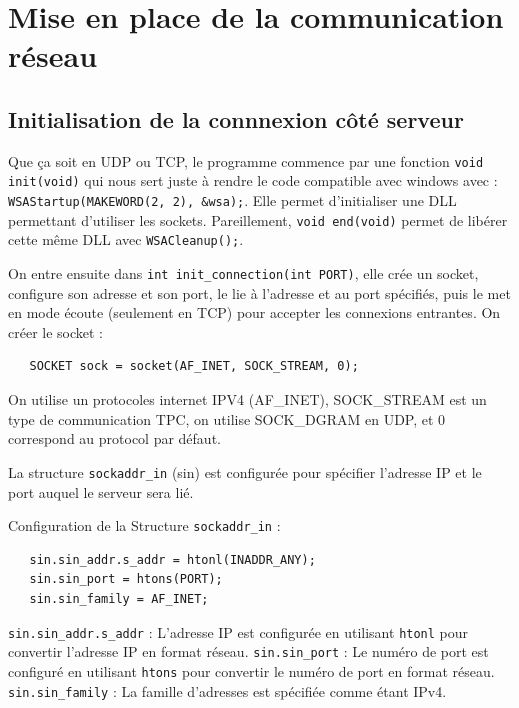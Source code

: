 \documentclass{article}
\begin{document}
\section{Mise en place de la communication réseau}

\subsection{Initialisation de la connnexion côté serveur}
Que ça soit en UDP ou TCP, le programme commence par une fonction \texttt{void init(void)} qui nous sert juste à rendre le code compatible avec windows avec : \texttt{WSAStartup(MAKEWORD(2, 2), &wsa);}. Elle permet d'initialiser une DLL permettant d'utiliser les sockets. Pareillement, \texttt{void end(void)} permet de libérer cette même DLL avec \texttt{WSACleanup();}.

On entre ensuite dans \texttt{int init_connection(int PORT)}, elle crée un socket, configure son adresse et son port, le lie à l'adresse et au port spécifiés, puis le met en mode écoute (seulement en TCP) pour accepter les connexions entrantes.
On créer le socket : 

\begin{verbatim}
   SOCKET sock = socket(AF_INET, SOCK_STREAM, 0);
\end{verbatim}
On utilise un protocoles internet IPV4 (AF\_INET), SOCK\_STREAM est un type de communication TPC, on utilise SOCK\_DGRAM en UDP, et 0 correspond au protocol par défaut. 

La structure \texttt{sockaddr_in} (sin) est configurée pour spécifier l'adresse IP et le port auquel le serveur sera lié.

Configuration de la Structure \texttt{sockaddr_in} :

\begin{verbatim}
   sin.sin_addr.s_addr = htonl(INADDR_ANY);
   sin.sin_port = htons(PORT);
   sin.sin_family = AF_INET;
\end{verbatim}

\texttt{sin.sin_addr.s_addr} : L'adresse IP est configurée en utilisant \texttt{htonl} pour convertir l'adresse IP en format réseau.
\newline
\texttt{sin.sin_port} : Le numéro de port est configuré en utilisant \texttt{htons} pour convertir le numéro de port en format réseau.
\newline
\texttt{sin.sin_family} : La famille d'adresses est spécifiée comme étant IPv4.
\end{document}
